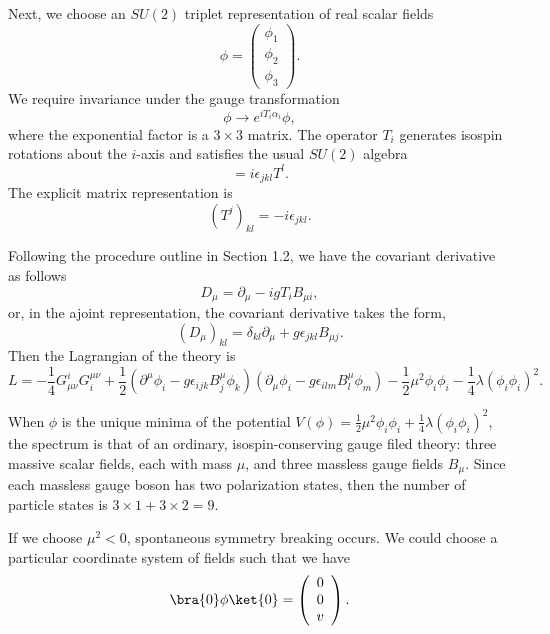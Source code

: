 Next, we choose an $SU(2)$ triplet representation of real scalar fields
\begin{equation}
\phi=\left(
\begin{array}{c}
\phi_1\\ \phi_2\\ \phi_3
\end{array}
\right).
\end{equation}
We require invariance under the gauge transformation
\begin{equation}
\phi\to e^{iT_i \alpha_i}\phi,
\end{equation}
where the exponential factor is a $3\times3$ matrix. The operator $T_i$ generates isospin rotations about the $i$-axis and satisfies the usual $SU(2)$ algebra
\begin{equation}
[T^j,T^k]=i\epsilon_{jkl}T^l.
\end{equation}
The explicit matrix representation is 
\begin{equation}
(T^j)_{kl} = -i\epsilon_{jkl}.
\end{equation}

Following the procedure outline in Section 1.2, we have the covariant derivative as follows
\begin{equation}
D_\mu = \partial_\mu - igT_i B_{\mu i},
\end{equation}
or, in the ajoint representation, the covariant derivative takes the form,
\begin{equation}
(D_\mu)_{kl}=\delta_{kl}\partial_\mu + g\epsilon_{jkl}B_{\mu j}.
\end{equation}
Then the Lagrangian of the theory is 
\begin{equation}
L=-\frac{1}{4}G^i_{\mu\nu}G_i^{\mu\nu}+\frac{1}{2}(\partial^\mu\phi_i-g\epsilon_{ijk}B^\mu_j\phi_k)
(\partial_\mu\phi_i-g\epsilon_{ilm}B^\mu_l\phi_m)-\frac{1}{2}\mu^2\phi_i\phi_i-\frac{1}{4}\lambda(\phi_i\phi_i)^2.
\end{equation}

When $\phi$ is the unique minima of the potential $V(\phi)=\frac{1}{2}\mu^2\phi_i\phi_i+\frac{1}{4}\lambda(\phi_i\phi_i)^2$, the spectrum is that of an ordinary, isospin-conserving gauge filed theory: three massive scalar fields, each with mass $\mu$, and three massless gauge fields $B_\mu$. Since each massless gauge boson has two polarization states, then the number of particle states is $3\times1+3\times2=9$. 

If we choose $\mu^2<0$, spontaneous symmetry breaking occurs. We could choose a particular coordinate system of fields such that we have 
\begin{equation}
\bra{0}\phi\ket{0}=\left(
\begin{array}{c}
0\\0\\v
\end{array}\right).
\end{equation} 

